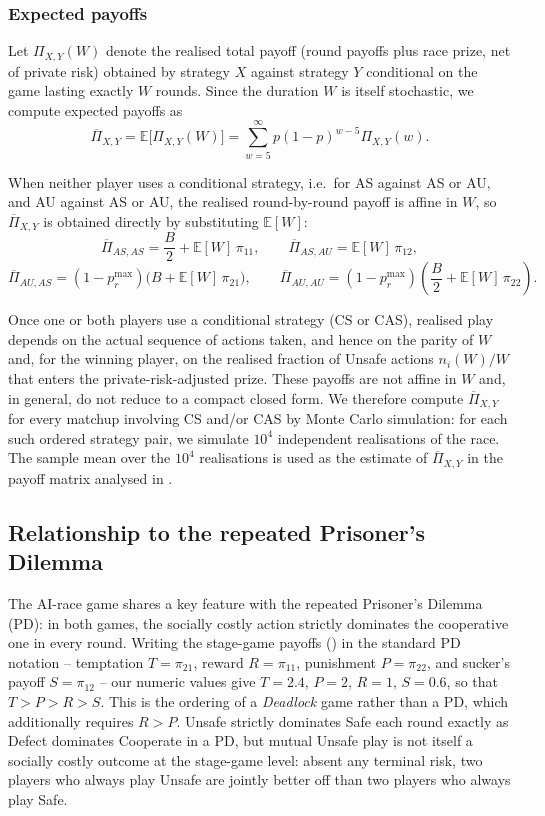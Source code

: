 \documentclass[pdflatex,sn-mathphys-ay]{sn-jnl}
\theoremstyle{thmstyleone}
\theoremstyle{thmstyletwo}
\theoremstyle{thmstylethree}
\begin{document}
\subsubsection{Expected payoffs}
\label{si:sec:expected-payoffs}

Let \(\Pi_{X,Y}(W)\) denote the realised total payoff (round payoffs plus race prize, net of private risk) obtained by strategy \(X\) against strategy \(Y\) conditional on the game lasting exactly \(W\) rounds. Since the duration \(W\) is itself stochastic, we compute expected payoffs as
\[
\overline{\Pi}_{X,Y}
=
\mathbb{E}\bigl[\Pi_{X,Y}(W)\bigr]
=
\sum_{w=5}^{\infty}p(1-p)^{w-5}\Pi_{X,Y}(w).
\]

When neither player uses a conditional strategy, i.e.\ for AS against AS or AU, and AU against AS or AU, the realised round-by-round payoff is affine in \(W\), so \(\overline{\Pi}_{X,Y}\) is obtained directly by substituting \(\mathbb{E}[W]\):
\[
\overline{\Pi}_{AS,AS}=\frac{B}{2}+\mathbb{E}[W]\,\pi_{11},
\qquad
\overline{\Pi}_{AS,AU}=\mathbb{E}[W]\,\pi_{12},
\]
\[
\overline{\Pi}_{AU,AS}=\left(1-p_r^{\max}\right)\bigl(B+\mathbb{E}[W]\,\pi_{21}\bigr),
\qquad
\overline{\Pi}_{AU,AU}=\left(1-p_r^{\max}\right)\left(\frac{B}{2}+\mathbb{E}[W]\,\pi_{22}\right).
\]

Once one or both players use a conditional strategy (CS or CAS), realised play depends on the actual sequence of actions taken, and hence on the parity of \(W\) and, for the winning player, on the realised fraction of Unsafe actions \(n_i(W)/W\) that enters the private-risk-adjusted prize. These payoffs are not affine in \(W\) and, in general, do not reduce to a compact closed form. We therefore compute \(\overline{\Pi}_{X,Y}\) for every matchup involving CS and/or CAS by Monte Carlo simulation: for each such ordered strategy pair, we simulate \(10^4\) independent realisations of the race. The sample mean over the \(10^4\) realisations is used as the estimate of \(\overline{\Pi}_{X,Y}\) in the payoff matrix analysed in .

\subsection{Relationship to the repeated Prisoner's Dilemma}
\label{si:sec:pd-relationship}

The AI-race game shares a key feature with the repeated Prisoner's Dilemma (PD): in both games, the socially costly action strictly dominates the cooperative one in every round. Writing the stage-game payoffs () in the standard PD notation -- temptation \(T=\pi_{21}\), reward \(R=\pi_{11}\), punishment \(P=\pi_{22}\), and sucker's payoff \(S=\pi_{12}\) -- our numeric values give \(T=2.4\), \(P=2\), \(R=1\), \(S=0.6\), so that \(T>P>R>S\). This is the ordering of a \emph{Deadlock} game rather than a PD, which additionally requires \(R>P\). Unsafe strictly dominates Safe each round exactly as Defect dominates Cooperate in a PD, but mutual Unsafe play is not itself a socially costly outcome at the stage-game level: absent any terminal risk, two players who always play Unsafe are jointly better off than two players who always play Safe.
\end{document}
